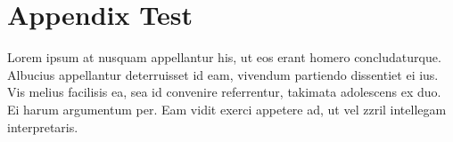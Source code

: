 \chapter{Appendix Test}
Lorem ipsum at nusquam appellantur his, ut eos erant homero
concludaturque. Albucius appellantur deterruisset id eam, vivendum
partiendo dissentiet ei ius. Vis melius facilisis ea, sea id convenire
referrentur, takimata adolescens ex duo. Ei harum argumentum per. Eam
vidit exerci appetere ad, ut vel zzril intellegam interpretaris.

\begin{comment}
Entonces, es importante recordar algunas propiedades de una cadena de Márkov, que ennumera Jordan (paper 2007) y que se pueden deducir usando el teorema de separación-d.
\begin{align}
\begin{split}
  p(\mb{X} \,|\, z_n) =~ &p(x_1, ..., x_n \,|\, z_n) 
  \\ &p(x_{n+1}, ..., x_N \,|\, z_n)
\end{split} \label{eqn:3-10} \\
p(x_1, ..., x_{n-1} \,|\, x_n, z_n) =~ 
  &p(x_1, ..., x_{n-1} \,|\, z_n) 
\label{eqn:3-11} \\
p(x_1, ..., x_{n-1} \,|\, z_{n-1}, z_n) =~ 
  &p(x_1, ..., x_{n-1} \,|\, z_{n-1}) 
\label{eqn:3-12} \\
p(x_{n+1}, ..., x_N \,|\, z_n, z_{n+1}) =~ 
  &p(x_{n+1}, ..., x_N \,|\, z_{n+1}) 
\label{eqn:3-13} \\
p(x_{n+2}, ..., x_N \,|\, z_{n+1}, x_{n+1}) =~ 
  &p(x_{n+2}, ..., x_N \,|\, z_{n+1}11 
\label{eqn:3-14} \\ 
\begin{split}
  p(\mb{X} \,|\, z_{n-1}, z_n) =~ &p(x_1, ..., x_{n-1} \,|\, z_{n-1}) 
  \\ &p(x_n \,|\, z_n) 
  \\ &p(x_{n+1}, ..., x_N | z_n)
\end{split} \label{eqn:3-15} \\
  p(x_{N+1} \,|\, \mb{X} ,z_{N+1}) =~ &p(x_{N+1} \,|\, z_{N+1}) 
\label{eqn:3-16} \\
p(z_{N+1} \,|\, z_N, \mb{X}) =~ &p(z_{N+1} \,|\, z_N) 
\label{eqn:3-17} \\
\end{align}
donde $\mb{X} = \lbrce x_1, ..., x_N \rbrace$. 
\end{comment}

